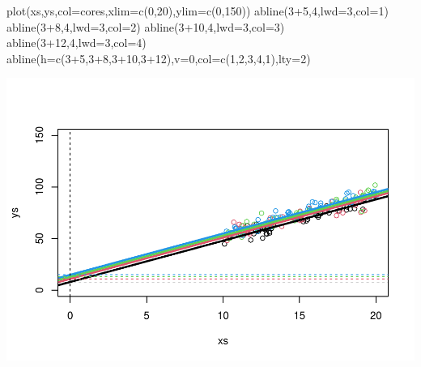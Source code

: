 \documentclass[
]{book}
\newenvironment{Shaded}{\begin{snugshade}}{\end{snugshade}}
\newcommand{\AttributeTok}[1]{\textcolor[rgb]{0.77,0.63,0.00}{#1}}
\newcommand{\DecValTok}[1]{\textcolor[rgb]{0.00,0.00,0.81}{#1}}
\newcommand{\FunctionTok}[1]{\textcolor[rgb]{0.00,0.00,0.00}{#1}}
\newcommand{\NormalTok}[1]{#1}
\newcommand{\SpecialCharTok}[1]{\textcolor[rgb]{0.00,0.00,0.00}{#1}}
\begin{document}
\begin{Shaded}
\begin{Highlighting}[]
\FunctionTok{plot}\NormalTok{(xs,ys,}\AttributeTok{col=}\NormalTok{cores,}\AttributeTok{xlim=}\FunctionTok{c}\NormalTok{(}\DecValTok{0}\NormalTok{,}\DecValTok{20}\NormalTok{),}\AttributeTok{ylim=}\FunctionTok{c}\NormalTok{(}\DecValTok{0}\NormalTok{,}\DecValTok{150}\NormalTok{))}
\FunctionTok{abline}\NormalTok{(}\DecValTok{3}\SpecialCharTok{+}\DecValTok{5}\NormalTok{,}\DecValTok{4}\NormalTok{,}\AttributeTok{lwd=}\DecValTok{3}\NormalTok{,}\AttributeTok{col=}\DecValTok{1}\NormalTok{)}
\FunctionTok{abline}\NormalTok{(}\DecValTok{3}\SpecialCharTok{+}\DecValTok{8}\NormalTok{,}\DecValTok{4}\NormalTok{,}\AttributeTok{lwd=}\DecValTok{3}\NormalTok{,}\AttributeTok{col=}\DecValTok{2}\NormalTok{)}
\FunctionTok{abline}\NormalTok{(}\DecValTok{3}\SpecialCharTok{+}\DecValTok{10}\NormalTok{,}\DecValTok{4}\NormalTok{,}\AttributeTok{lwd=}\DecValTok{3}\NormalTok{,}\AttributeTok{col=}\DecValTok{3}\NormalTok{)}
\FunctionTok{abline}\NormalTok{(}\DecValTok{3}\SpecialCharTok{+}\DecValTok{12}\NormalTok{,}\DecValTok{4}\NormalTok{,}\AttributeTok{lwd=}\DecValTok{3}\NormalTok{,}\AttributeTok{col=}\DecValTok{4}\NormalTok{)}
\FunctionTok{abline}\NormalTok{(}\AttributeTok{h=}\FunctionTok{c}\NormalTok{(}\DecValTok{3}\SpecialCharTok{+}\DecValTok{5}\NormalTok{,}\DecValTok{3}\SpecialCharTok{+}\DecValTok{8}\NormalTok{,}\DecValTok{3}\SpecialCharTok{+}\DecValTok{10}\NormalTok{,}\DecValTok{3}\SpecialCharTok{+}\DecValTok{12}\NormalTok{),}\AttributeTok{v=}\DecValTok{0}\NormalTok{,}\AttributeTok{col=}\FunctionTok{c}\NormalTok{(}\DecValTok{1}\NormalTok{,}\DecValTok{2}\NormalTok{,}\DecValTok{3}\NormalTok{,}\DecValTok{4}\NormalTok{,}\DecValTok{1}\NormalTok{),}\AttributeTok{lty=}\DecValTok{2}\NormalTok{)}
\end{Highlighting}
\end{Shaded}

\includegraphics{ECOMODbook_files/figure-latex/a9.3-1.pdf}
\end{document}
